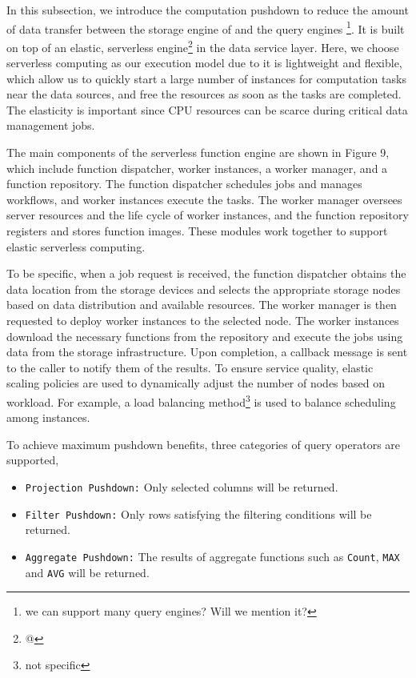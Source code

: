 In this subsection, we introduce the computation pushdown to reduce the amount of data transfer between the  storage engine of \sys and the query engines \footnote{we can support many query engines? Will we mention it?}. It is built on top of an elastic, serverless engine\footnote{@} in the data service layer. Here, we choose serverless computing as our execution model due to it is lightweight  and flexible, which allow us to quickly start a large number of instances for computation tasks near the data sources, and free the resources as soon as the tasks are completed. The elasticity is important since CPU resources can be scarce during critical data management jobs.

The main components of the serverless function engine are shown in Figure 9, which include function dispatcher, worker instances, a worker manager, and a function repository. The function dispatcher schedules jobs and manages workflows, and worker instances execute the tasks. The worker manager oversees server resources and the life cycle of worker instances, and the function repository registers and stores function images. These modules work together to support elastic serverless computing.



To be specific, when a job request is received, the function dispatcher obtains the data location from the storage devices and selects the appropriate storage nodes based on data distribution and available resources. The worker manager is then requested to deploy worker instances to the selected node. The worker instances download the necessary functions from the repository and execute the jobs using data from the storage infrastructure. Upon completion, a callback message is sent to the caller to notify them of the results. To ensure service quality, elastic scaling policies are used to dynamically adjust the number of nodes based on workload. For example, a load balancing method\footnote{not specific} is used to balance scheduling among instances.


To achieve maximum pushdown benefits, three categories of query operators are supported, 

\begin{itemize}

\item \texttt{Projection Pushdown:}  Only selected columns will be returned.

\item \texttt{Filter Pushdown:} Only rows satisfying the filtering conditions will be returned.

\item \texttt{Aggregate  Pushdown:} The results of aggregate functions such as \texttt{Count}, \texttt{MAX} and \texttt{AVG} will be returned.

\end{itemize}

